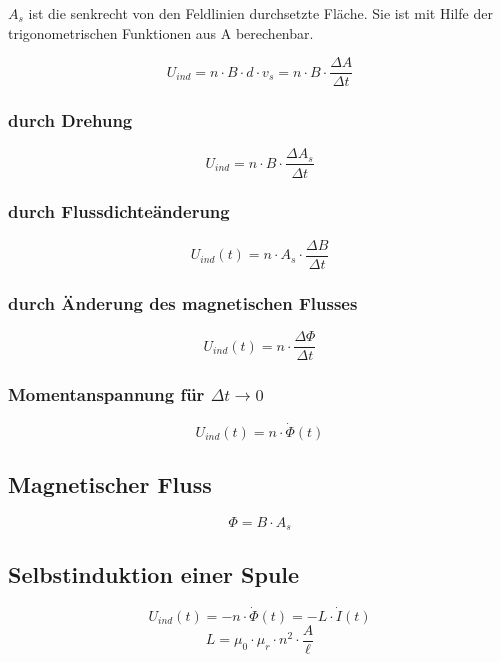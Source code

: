 $A_s$ ist die senkrecht von den Feldlinien durchsetzte Fläche. Sie ist mit Hilfe der trigonometrischen Funktionen aus A berechenbar.
 
\begin{equation}\label{eq:magnetische:induktion:flaechenaenderung}
U_{ind} = n \cdot B \cdot d \cdot v_s = n \cdot B \cdot \frac{\Delta A}{\Delta t}
\end{equation}

\subsubsection{durch Drehung}
\begin{equation}\label{eq:magnetische:induktion:drehung}
U_{ind} = n \cdot B \cdot \frac{\Delta A_s}{\Delta t}
\end{equation}

\subsubsection{durch Flussdichteänderung}
\begin{equation}\label{eq:magnetische:induktion:flussdichteaenderung}
U_{ind}(t) = n \cdot A_s \cdot \frac{\Delta B}{\Delta t}
\end{equation}
  
\subsubsection{durch Änderung des magnetischen Flusses}
\begin{equation}\label{eq:magnetische:induktion:flussaenderung}
U_{ind}(t) = n \cdot \frac{\Delta \Phi}{\Delta t}
\end{equation}

\subsubsection{Momentanspannung für $\Delta t \to 0$}
\begin{equation}\label{eq:magnetische:induktion:momentanspannung}
U_{ind}(t) = n \cdot \dot{\Phi}(t)
\end{equation}

\subsection{Magnetischer Fluss}
\begin{equation}\label{eq:magnetischer:fluss}
\Phi = B \cdot A_s
\end{equation}

\subsection{Selbstinduktion einer Spule}
\begin{equation}\label{eq:spule:selbstinduktion}
U_{ind}(t) = - n \cdot \dot{\Phi}(t) = - L \cdot \dot{I}(t)
\end{equation}
\begin{equation}\label{eq:spule:induktivitaet}
L = \mu_0\cdot
\mu_r \cdot n^2 \cdot \frac{A}{\ell}
\end{equation}